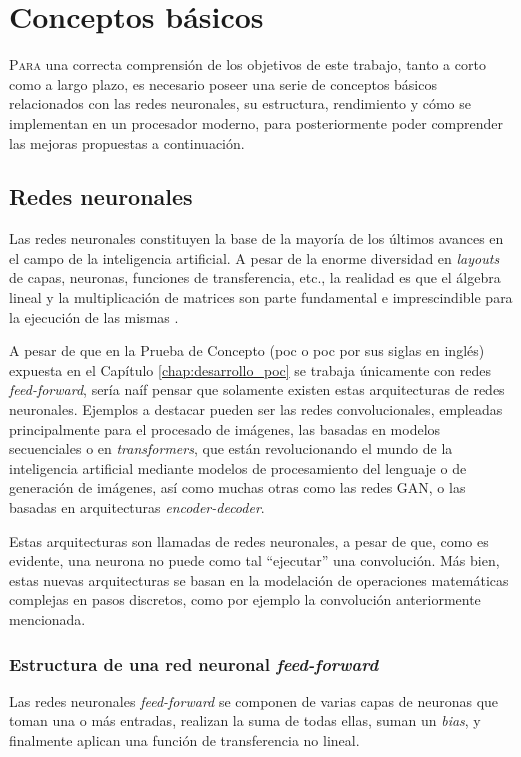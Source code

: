 \chapter{Conceptos básicos}
\label{chap:conceptos_basicos}

\lettrine{P}{ara} una correcta comprensión de los objetivos de este trabajo, tanto a corto como a largo plazo, es necesario poseer una serie de conceptos básicos relacionados con las redes neuronales, su estructura, rendimiento y cómo se implementan en un procesador moderno, para posteriormente poder comprender las mejoras propuestas a continuación.

\section{Redes neuronales}
\label{sec:redes_neuronales}
Las redes neuronales constituyen la base de la mayoría de los últimos avances en el campo de la inteligencia artificial. A pesar de la enorme diversidad en \textit{layouts} de capas, neuronas, funciones de transferencia, etc., la realidad es que el álgebra lineal y la multiplicación de matrices son parte fundamental e imprescindible para la ejecución de las mismas \cite[Figura 3.4]{deep_learning_for_computer_architects}.

A pesar de que en la Prueba de Concepto (\acrlong{poc} o \acrshort{poc} por sus siglas en inglés) expuesta en el Capítulo \ref{chap:desarrollo_poc} se trabaja únicamente con redes \textit{feed-forward}, sería naíf pensar que solamente existen estas arquitecturas de redes neuronales. Ejemplos a destacar pueden ser las redes convolucionales, empleadas principalmente para el procesado de imágenes, las basadas en modelos secuenciales o en \textit{transformers}, que están revolucionando el mundo de la inteligencia artificial mediante modelos de procesamiento del lenguaje o de generación de imágenes, así como muchas otras como las redes GAN, o las basadas en arquitecturas \textit{encoder-decoder}.

Estas arquitecturas son llamadas de redes neuronales, a pesar de que, como es evidente, una neurona no puede como tal ``ejecutar'' una convolución. Más bien, estas nuevas arquitecturas se basan en la modelación de operaciones matemáticas complejas en pasos discretos, como por ejemplo la convolución anteriormente mencionada.

\subsection{Estructura de una red neuronal \textit{feed-forward}}
\label{ssec:estructura_red_neuronal_ff}
Las redes neuronales \textit{feed-forward} se componen de varias capas de neuronas que toman una o más entradas, realizan la suma de todas ellas, suman un \textit{bias}, y finalmente aplican una función de transferencia no lineal.

